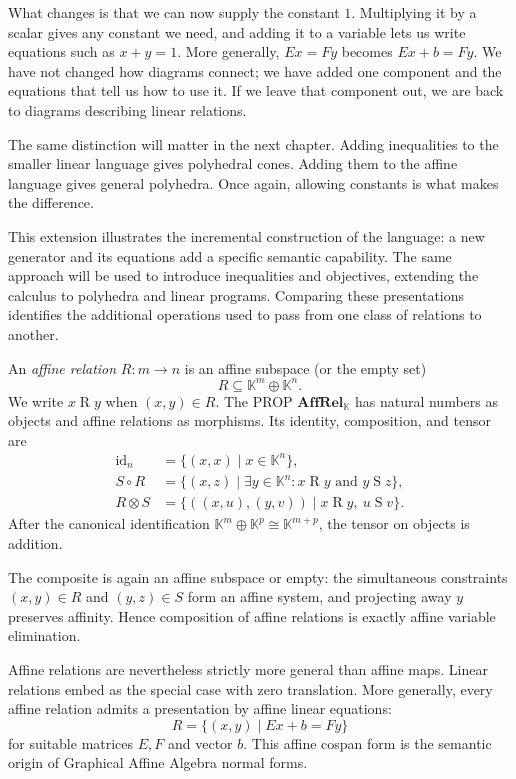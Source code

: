 What changes is that we can now supply the constant $1$. Multiplying it
by a scalar gives any constant we need, and adding it to a variable lets
us write equations such as $x+y=1$. More generally, $Ex=Fy$ becomes
$Ex+b=Fy$. We have not changed how diagrams connect; we have added one
component and the equations that tell us how to use it. If we leave that
component out, we are back to diagrams describing linear relations.

The same distinction will matter in the next chapter. Adding inequalities
to the smaller linear language gives polyhedral cones. Adding them to the
affine language gives general polyhedra. Once again, allowing constants
is what makes the difference.

This extension illustrates the incremental construction of the language:
a new generator and its equations add a specific semantic capability.
The same approach will be used to introduce inequalities and objectives,
extending the calculus to polyhedra and linear programs. Comparing these
presentations identifies the additional operations used to pass from one
class of relations to another.


\begin{definition}
An \emph{affine relation} $R:m\to n$ is an affine subspace (or the empty set)
\[
 R\subseteq\mathbb K^m\oplus\mathbb K^n.
\]
We write $x\mathrel{R}y$ when $(x,y)\in R$.  The PROP
$\mathbf{AffRel}_{\mathbb K}$ has natural numbers as objects and affine
relations as morphisms.  Its identity, composition, and tensor are
\begin{align*}
 \mathrm{id}_n
   &=\{(x,x)\mid x\in\mathbb K^n\},\\
 S\circ R
   &=\{(x,z)\mid \exists y\in\mathbb K^n:
                    x\mathrel{R}y\text{ and }y\mathrel{S}z\},\\
 R\otimes S
   &=\{((x,u),(y,v))\mid x\mathrel{R}y,
                              \ u\mathrel{S}v\}.
\end{align*}
After the canonical identification
$\mathbb K^m\oplus\mathbb K^p\cong\mathbb K^{m+p}$, the tensor on objects is
addition.
\end{definition}

The composite is again an affine subspace or empty: the simultaneous
constraints $(x,y)\in R$ and $(y,z)\in S$ form an affine system, and projecting
away $y$ preserves affinity.  Hence composition of affine relations is exactly
affine variable elimination.

Affine relations are nevertheless strictly more general than affine maps.
Linear relations embed as the special case with zero translation. More generally,
every affine relation admits a presentation by affine linear equations:
\[
 R=\{(x,y)\mid Ex+b=Fy\}
\]
for suitable matrices $E,F$ and vector $b$. This affine cospan form is the
semantic origin of Graphical Affine Algebra normal forms.

